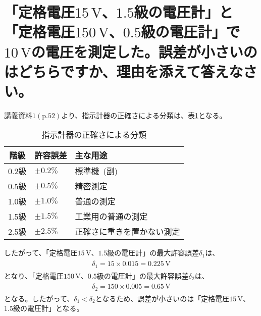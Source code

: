\documentclass[a4paper,11pt]{jsarticle}
\begin{document}
\title{}
\author{}
\date{\today}


\section{「定格電圧$15\mathrm{\,\si{\volt}}$、$1.5$級の電圧計」と「定格電圧$150\mathrm{\, \si{\volt}}$、$0.5$級の電圧計」で$10\mathrm{\,\si{\volt}}$の電圧を測定した。誤差が小さいのはどちらですか、理由を添えて答えなさい。}

講義資料$1(\mathrm{p}. 52)$より、指示計器の正確さによる分類は、表\ref{tab1}となる。
\begin{table}[htbp]
  \centering
  \caption{指示計器の正確さによる分類}\label{tab1}
  \begin{tabular}{cll}
    \toprule
    階級&許容誤差&主な用途\\
    \midrule
    0.2級&$\pm 0.2 \%$&標準機~(副)\\
    0.5級&$\pm 0.5 \%$&精密測定\\
    1.0級&$\pm 1.0 \%$&普通の測定\\
    1.5級&$\pm 1.5 \%$&工業用の普通の測定\\
    2.5級&$\pm 2.5 \%$&正確さに重きを置かない測定\\
    \bottomrule
  \end{tabular}
\end{table}

したがって、「定格電圧$15\mathrm{\,\si{\volt}}$、$1.5$級の電圧計」の最大許容誤差$\delta _{1}$は、
\begin{align}
  \begin{split}
    \delta _{1}=15\times 0.015=0.225 \mathrm{\,\si{\volt}}
  \end{split}
\end{align}
となり、「定格電圧$150\mathrm{\, \si{\volt}}$、$0.5$級の電圧計」の最大許容誤差$\delta _{2}$は、
\begin{align}
  \begin{split}
    \delta _{2}=150 \times 0.005 = 0.65 \mathrm{\,\si{\volt}}
  \end{split}
\end{align}
となる。したがって、$\delta _{1}<\delta _{2}$となるため、誤差が小さいのは「定格電圧$15\mathrm{\,\si{\volt}}$、$1.5$級の電圧計」となる。
\end{document}
